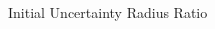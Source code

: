 \documentclass[]{aiaa-tc}%
\begin{document}
\begin{figure}[H]
 \begin{subfigmatrix}{2}%
\centering
  \hspace*{0mm}
 \end{subfigmatrix}
 \caption{Initial Uncertainty Radius Ratio}
 \label{fig:RinitSelection}
\end{figure}
\end{document}
